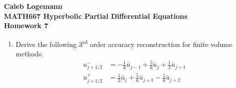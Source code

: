 \documentclass[11pt, oneside]{article}
\begin{document}
\noindent \textbf{\Large{Caleb Logemann \\
MATH667 Hyperbolic Partial Differential Equations \\
Homework 7
}}

%
\begin{enumerate}
    \item %
      Derive the following 3\textsuperscript{rd} order accuracy reconstruction
      for finite volume methods.
      \begin{align*}
        u_{j+1/2}^- &= -\frac{1}{6} \bar{u}_{j-1} + \frac{5}{6}\bar{u}_j + \frac{1}{3}\bar{u}_{j+1} \\
        u_{j+1/2}^+ &= \frac{1}{3} \bar{u}_{j} + \frac{5}{6}\bar{u}_{j+1} - \frac{1}{6}\bar{u}_{j+2}
      \end{align*}


\end{enumerate}
\end{document}

